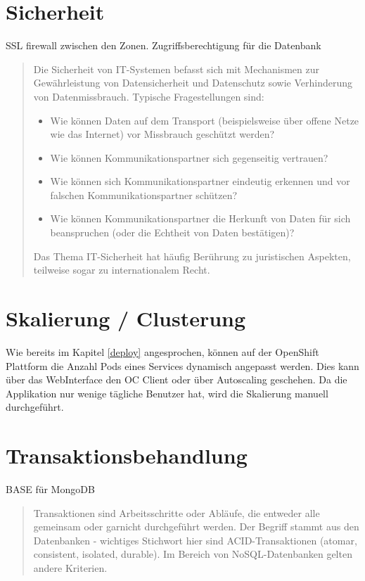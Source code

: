 \section{Sicherheit}

SSL firewall zwischen den Zonen. Zugriffsberechtigung für die Datenbank

\begin{quote}
	Die Sicherheit von IT-Systemen befasst sich mit Mechanismen zur Gewährleistung von Datensicherheit und Datenschutz sowie Verhinderung von Datenmissbrauch.
	Typische Fragestellungen sind:
	\begin{itemize}
		\item Wie können Daten auf dem Transport (beispielsweise über offene Netze wie das Internet) vor Missbrauch geschützt werden?
		\item Wie können Kommunikationspartner sich gegenseitig vertrauen?
		\item Wie können sich Kommunikationspartner eindeutig erkennen und vor falschen Kommunikationspartner schützen?
		\item Wie können Kommunikationspartner die Herkunft von Daten für sich beanspruchen (oder die Echtheit von Daten bestätigen)?
	\end{itemize}
	Das Thema IT-Sicherheit hat häufig Berührung zu juristischen Aspekten, teilweise sogar zu internationalem Recht.
\end{quote}

\section{Skalierung / Clusterung}

Wie bereits im Kapitel \ref{deploy} angesprochen, können auf der OpenShift Plattform die Anzahl Pods eines Services dynamisch angepasst werden. Dies kann über das WebInterface den OC Client oder über Autoscaling geschehen. Da die Applikation nur wenige tägliche Benutzer hat, wird die Skalierung manuell durchgeführt.

\section{Transaktionsbehandlung}

BASE für MongoDB

\begin{quote}
	Transaktionen sind Arbeitsschritte oder Abläufe, die entweder alle gemeinsam oder garnicht durchgeführt werden. Der Begriff stammt aus den Datenbanken - wichtiges Stichwort hier sind ACID-Transaktionen (atomar, consistent, isolated, durable). Im Bereich von NoSQL-Datenbanken gelten andere Kriterien.
\end{quote}

